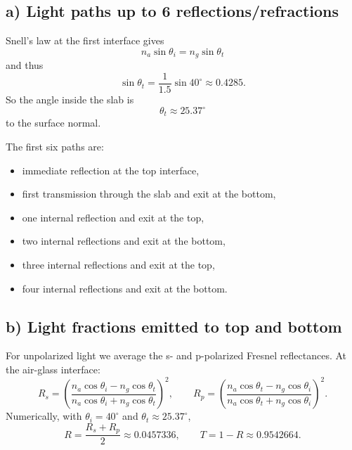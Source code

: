 \documentclass[a4paper,11pt]{article}
\begin{document}
\subsection*{a) Light paths up to 6 reflections/refractions}
Snell's law at the first interface gives
\[
n_a \sin\theta_i = n_g \sin\theta_t
\]
and thus
\[
\sin\theta_t = \frac{1}{1.5}\sin 40^\circ \approx 0.4285.
\]
So the angle inside the slab is
\[
\theta_t \approx 25.37^\circ
\]
to the surface normal.

The first six paths are:
\begin{itemize}
    \item immediate reflection at the top interface,
    \item first transmission through the slab and exit at the bottom,
    \item one internal reflection and exit at the top,
    \item two internal reflections and exit at the bottom,
    \item three internal reflections and exit at the top,
    \item four internal reflections and exit at the bottom.
\end{itemize}

\begin{center}
\end{center}

\subsection*{b) Light fractions emitted to top and bottom}
For unpolarized light we average the s- and p-polarized Fresnel reflectances. At the air-glass interface:
\[
R_s = \left(\frac{n_a\cos\theta_i - n_g\cos\theta_t}{n_a\cos\theta_i + n_g\cos\theta_t}\right)^2,
\qquad
R_p = \left(\frac{n_a\cos\theta_t - n_g\cos\theta_i}{n_a\cos\theta_t + n_g\cos\theta_i}\right)^2.
\]
Numerically, with $\theta_i = 40^\circ$ and $\theta_t \approx 25.37^\circ$,
\[
R = \frac{R_s + R_p}{2} \approx 0.0457336,
\qquad
T = 1 - R \approx 0.9542664.
\]
\end{document}
